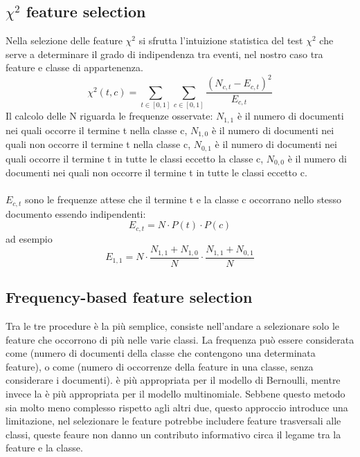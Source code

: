 \documentclass{article}
\theoremstyle{plain}
\theoremstyle{definition}
\begin{document}
\subsection{$\chi^2$ feature selection}
Nella selezione delle feature $\chi^2$ si sfrutta l'intuizione statistica del test $\chi^2$ che serve a determinare il grado di indipendenza tra eventi, nel nostro caso tra feature e classe di appartenenza.
\[\chi^2(t,c)=\sum_{t \in [0,1]} \sum_{c \in [0,1]} \frac{(N_{c,t} - E_{c,t})^2}{E_{c,t}} \]  Il calcolo delle N riguarda le frequenze osservate: $N_{1,1}$ è il numero di documenti nei quali occorre il termine t nella classe c, $N_{1,0}$ è il numero di documenti nei quali non occorre il termine t nella classe c, $N_{0,1}$ è il numero di documenti nei quali occorre il termine t in tutte le classi eccetto la classe c, $N_{0,0}$ è il numero di documenti nei quali non occorre il termine t in tutte le classi eccetto c. 
\\
\\
$E_{c,t}$ sono le frequenze attese che il termine t e la classe c occorrano nello stesso documento essendo indipendenti:
\[ E_{c,t}= N \cdot P(t) \cdot P(c) \] 
ad esempio
\[ E_{1,1}= N \cdot \frac{N_{1,1} + N_{1,0}}{N} \cdot \frac{N_{1,1} + N_{0,1}}{N} \]

\subsection{Frequency-based feature selection}
Tra le tre procedure è la più semplice, consiste nell'andare a selezionare solo le feature che occorrono di più nelle varie classi. La frequenza può essere considerata come  (numero di documenti della classe che contengono una determinata feature), o come  (numero di occorrenze della feature in una classe, senza considerare i documenti).
 è più appropriata per il modello di Bernoulli, mentre invece la  è più appropriata per il modello multinomiale. Sebbene questo metodo sia molto meno complesso rispetto agli altri due, questo approccio introduce una limitazione, nel selezionare le feature potrebbe includere feature trasversali alle classi, queste feaure non danno un contributo informativo circa il legame tra la feature e la classe.

\newpage
\end{document}
